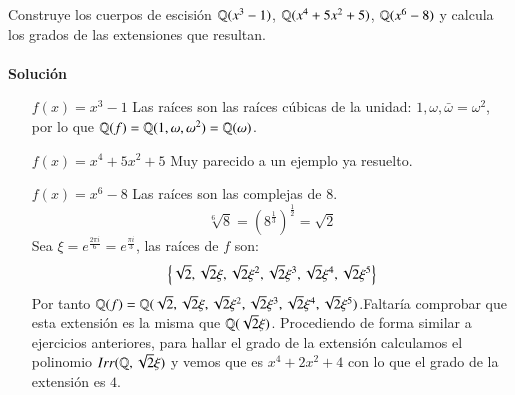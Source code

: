 \begin{ex}[H3.1]
    Construye los cuerpos de escisión $\mathbb{Q}(x^3-1)$, $\mathbb{Q}(x^4 + 5x^2 + 5)$, $\mathbb{Q}(x^6-8)$ y calcula los grados de las extensiones que resultan.\\\\

    \textbf{Solución}\\
    \begin{itemize}
        \item[$f(x) = x^3-1$] Las raíces son las raíces cúbicas de la unidad: $1, \omega, \bar\omega = \omega^2$, por lo que $\mathbb{Q}(f) = \mathbb{Q}(1, \omega, \omega^2) = \mathbb{Q}(\omega)$.
        \item[$f(x) = x^4+5x^2+5$] Muy parecido a un ejemplo ya resuelto.
        \item[$f(x) = x^6 - 8$] Las raíces son las complejas de $8$.
        $$
            \sqrt[6] 8 = (8^\frac{1}{3})^\frac{1}{2} = \sqrt 2
        $$
        Sea $\xi = e^\frac{2 \pi i}{6} = e^\frac{\pi i}{3}$, las raíces de $f$ son:
        $$
            \left\{\sqrt 2, \sqrt 2 \xi, \sqrt 2 \xi^2, \sqrt 2 \xi^3, \sqrt 2 \xi^4, \sqrt 2 \xi^5\right\}
        $$
        Por tanto $\mathbb{Q}(f) = \mathbb{Q}(\sqrt 2, \sqrt 2 \xi, \sqrt 2 \xi^2, \sqrt 2 \xi^3, \sqrt 2 \xi^4, \sqrt 2 \xi^5) $.Faltaría comprobar que esta extensión es la misma que $\mathbb{Q}(\sqrt 2 \xi)$. Procediendo de forma similar a ejercicios anteriores, para hallar el grado de la extensión calculamos el polinomio $Irr(\mathbb{Q}, \sqrt 2 \xi)$ y vemos que es $x^4 + 2x^2 + 4$ con lo que el grado de la extensión es $4$.
    \end{itemize}
\end{ex}

%

